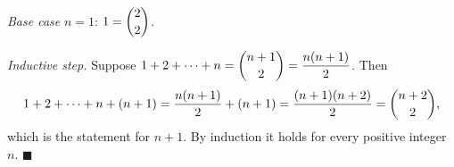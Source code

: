 \emph{Base case} $n=1$: $1=\dbinom22$.

\emph{Inductive step.} Suppose $1+2+\cdots+n=\dbinom{n+1}2=\dfrac{n(n+1)}2$. Then
\[1+2+\cdots+n+(n+1)=\dfrac{n(n+1)}2+(n+1)=\dfrac{(n+1)(n+2)}2=\dbinom{n+2}2,\]
which is the statement for $n+1$. By induction it holds for every positive integer $n$. $\blacksquare$
